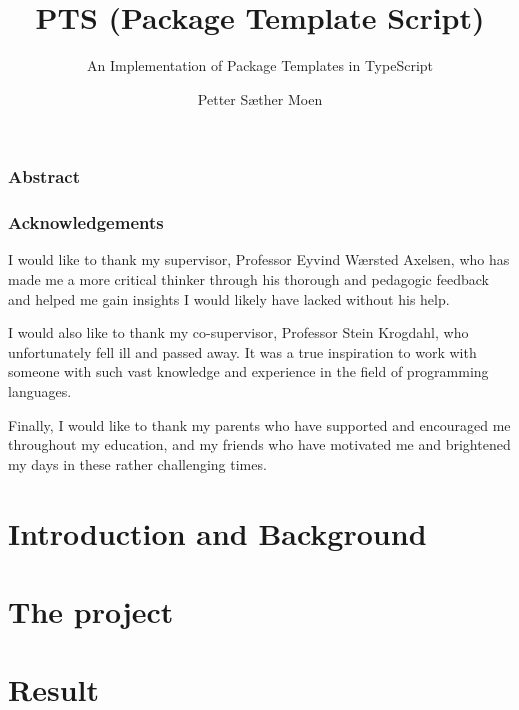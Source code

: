 \documentclass[UKenglish]{ifimaster}
\title{PTS (Package Template Script)}
\subtitle{An Implementation of Package Templates in TypeScript}
\author{Petter Sæther Moen}
\begin{document}


\duoforside[dept={Department of Informatics},
  program={Informatics: Programming and System Architecture},
  long]

\frontmatter{}

\clearpage
\section*{Abstract}

\cleardoublepage

\section*{Acknowledgements}

I would like to thank my supervisor, Professor Eyvind Wærsted Axelsen, who has made me a more critical thinker through his thorough and pedagogic feedback and helped me gain insights I would likely have lacked without his help.

I would also like to thank my co-supervisor, Professor Stein Krogdahl, who unfortunately fell ill and passed away.
It was a true inspiration to work with someone with such vast knowledge and experience in the field of programming languages.

Finally, I would like to thank my parents who have supported and encouraged me throughout my education, and my friends who have motivated me and brightened my days in these rather challenging times.

\hypersetup{linkcolor=black}

\tableofcontents{}
\listoflistings{}



\cleardoublepage

\hypersetup{linkcolor=blue}

\mainmatter{}


\part{Introduction and Background}\label{part:introduction}





\part{The project}\label{part:the-project}







\part{Result}\label{part:Results}






\backmatter{}
\printbibliography
\end{document}
